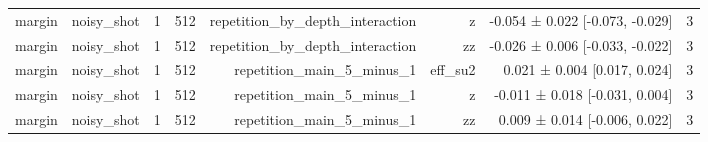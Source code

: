 \begin{table}
\begin{tabular}{lrrrrrrr}
margin & noisy\_shot & 1 & 512 & repetition\_by\_depth\_interaction & z & -0.054 ± 0.022 [-0.073, -0.029] & 3 \\
margin & noisy\_shot & 1 & 512 & repetition\_by\_depth\_interaction & zz & -0.026 ± 0.006 [-0.033, -0.022] & 3 \\
margin & noisy\_shot & 1 & 512 & repetition\_main\_5\_minus\_1 & eff\_su2 & 0.021 ± 0.004 [0.017, 0.024] & 3 \\
margin & noisy\_shot & 1 & 512 & repetition\_main\_5\_minus\_1 & z & -0.011 ± 0.018 [-0.031, 0.004] & 3 \\
margin & noisy\_shot & 1 & 512 & repetition\_main\_5\_minus\_1 & zz & 0.009 ± 0.014 [-0.006, 0.022] & 3 \\
\bottomrule
\end{tabular}
\end{table}


